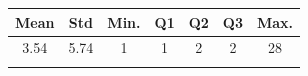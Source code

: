 \begin{tabular}{ccccccc}
    \toprule%
        \rowcolor{gray!30}
        Mean & Std & Min. & Q1 & Q2 & Q3 & Max. \\
    \midrule%
        3.54 & 5.74 & 1 & 1 & 2 & 2 & 28 \\
    \botrule%
\end{tabular}
